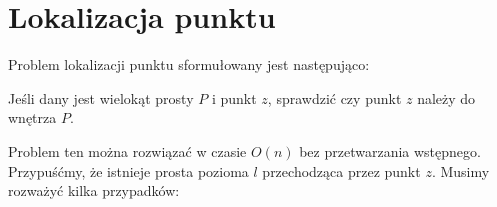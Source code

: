 \newcommand{\convex}{
  \coordinate (p1) at (2,0);
  \coordinate (p2) at (0,2);
  \coordinate (p3) at (1,3.5);
  \coordinate (p3) at (2,4);
  \coordinate (p4) at (4,3.25);
  \coordinate (p5) at (4.5,2);
  \coordinate (p6) at (3.75,1);
  \coordinate (p7) at (2,0);

  \draw (p1) -- (p2) -- (p3) -- (p4) -- (p5) -- (p6) -- (p7);

  \node [anchor=center,circle,draw,fill,inner sep=0.5pt,label={[anchor=south]below:$p_1$}] at (p1) {};
  \node [anchor=center,circle,draw,fill,inner sep=0.5pt,label={[anchor=west]left:$p_2$}] at (p2) {};
  \node [anchor=center,circle,draw,fill,inner sep=0.5pt,label={[anchor=west]above:$p_3$}] at (p3) {};
  \node [anchor=center,circle,draw,fill,inner sep=0.5pt,label={[anchor=west]right:$p_4$}] at (p4) {};
  \node [anchor=center,circle,draw,fill,inner sep=0.5pt,label={[anchor=west]right:$p_5$}] at (p5) {};
  \node [anchor=center,circle,draw,fill,inner sep=0.5pt,label={[anchor=west]below:$p_6$}] at (p6) {};
}

\chapter{Lokalizacja punktu}

Problem lokalizacji punktu sformułowany jest następująco:

\begin{problem}
  Jeśli dany jest wielokąt prosty $P$ i punkt $z$, sprawdzić czy punkt $z$
  należy do wnętrza $P$.
\end{problem}

Problem ten można rozwiązać w czasie $O(n)$ bez przetwarzania
wstępnego. Przypuśćmy, że istnieje prosta pozioma $l$ przechodząca
przez punkt $z$. Musimy rozważyć kilka przypadków:

